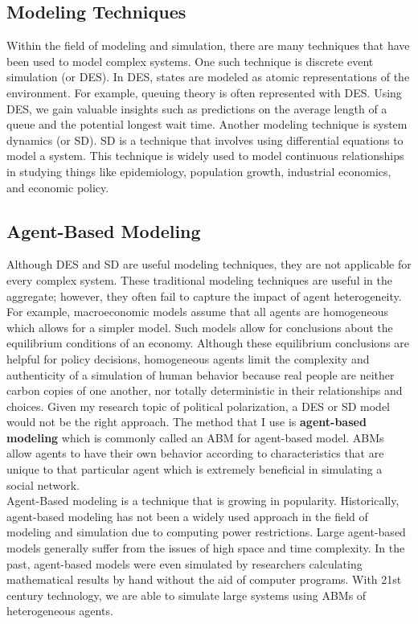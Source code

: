 \subsection{Modeling Techniques}
Within the field of modeling and simulation, there are many techniques that have been used to model complex systems. One such technique is discrete event simulation (or DES). In DES, states are modeled as atomic representations of the environment. For example, queuing theory is often represented with DES. Using DES, we gain valuable insights such as predictions on the average length of a queue and the potential longest wait time. Another modeling technique is system dynamics (or SD). SD is a technique that involves using differential equations to model a system. This technique is widely used to model continuous relationships in studying things like epidemiology, population growth, industrial economics, and economic policy.

\subsection{Agent-Based Modeling}
Although DES and SD are useful modeling techniques, they are not applicable for every complex system. These traditional modeling techniques are useful in the aggregate; however, they often fail to capture the impact of agent heterogeneity. For example, macroeconomic models assume that all agents are homogeneous which allows for a simpler model. Such models allow for conclusions about the equilibrium conditions of an economy. Although these equilibrium conclusions are helpful for policy decisions, homogeneous agents limit the complexity and authenticity of a simulation of human behavior because real people are neither carbon copies of one another, nor totally deterministic in their relationships and choices. Given my research topic of political polarization, a DES or SD model would not be the right approach. The method that I use is \textbf{agent-based modeling} which is commonly called an ABM for agent-based model. ABMs allow agents to have their own behavior according to characteristics that are unique to that particular agent which is extremely beneficial in simulating a social network. \\

Agent-Based modeling is a technique that is growing in popularity. Historically, agent-based modeling has not been a widely used approach in the field of modeling and simulation due to computing power restrictions. Large agent-based models generally suffer from the issues of high space and time complexity. In the past, agent-based models were even simulated by researchers calculating mathematical results by hand without the aid of computer programs. With 21st century technology, we are able to simulate large systems using ABMs of heterogeneous agents. 

